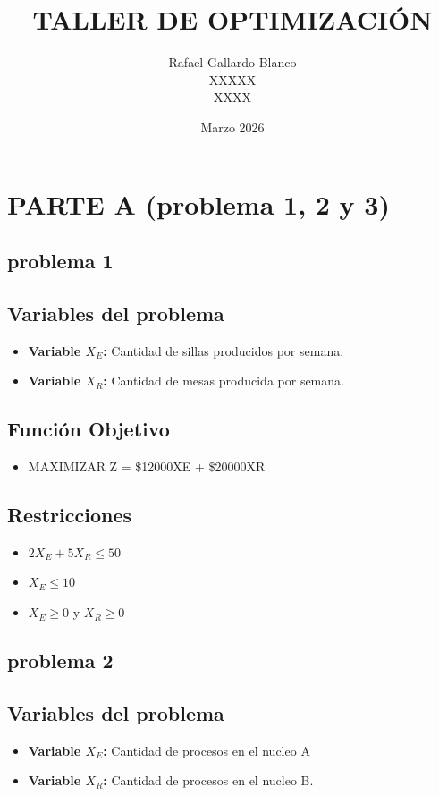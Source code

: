 \documentclass{article}
\title{TALLER DE OPTIMIZACIÓN}
\author{Rafael Gallardo Blanco \\ XXXXX \\ XXXX}
\date{Marzo 2026}
\begin{document}
\maketitle
\vspace{12cm}
\section*{PARTE A (problema 1, 2 y 3)}

\subsection*{problema 1}
\subsection*{Variables del problema}
\begin{itemize}
    \item \textbf{Variable $X_E$:} Cantidad de sillas producidos por semana.
    \item \textbf{Variable $X_R$:} Cantidad de mesas producida por semana.
\end{itemize}

\subsection*{Función Objetivo}
\begin{itemize}
    \item MAXIMIZAR Z = \$12000XE + \$20000XR
\end{itemize}

\subsection*{Restricciones}
\begin{itemize}
    \item $2X_E + 5X_R \leq 50$ 
    \item $X_E \leq 10$ 
    \item $X_E \geq 0$ y $X_R \geq 0$ 
\end{itemize}

\subsection*{problema 2}
\subsection*{Variables del problema}
\begin{itemize}
    \item \textbf{Variable $X_E$:} Cantidad de procesos en el nucleo A
    \item \textbf{Variable $X_R$:} Cantidad de procesos en el nucleo B.
\end{itemize}
\end{document}
